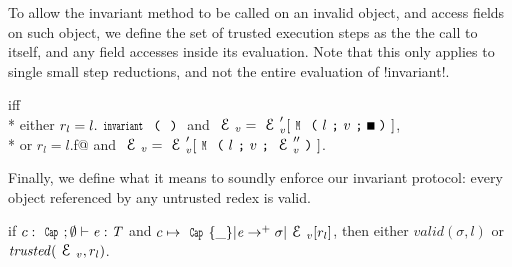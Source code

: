 \noindent 
To allow the invariant method to be called on an invalid object, and access fields on such object, we define the set of trusted execution steps as the the call to \Q@invariant@ itself, and any field accesses inside its evaluation. Note that this only applies to single small step reductions, and not the entire evaluation of \Q!invariant!.

\noindent {} iff\\*
\indent either
$r_l=l.\invariant$ and
$\ctx_v=\ctx_v'[\M{l}{v}{\square}]$,\\*
\indent or
$r_l=l$\Q@.f@ and
$\ctx_v=\ctx_v'[\M{l}{v}{\ctx_v''}]$.

\noindent Finally, we define what it means to soundly enforce our invariant protocol: every object referenced by any untrusted redex is valid.

\begin{theorem}[Soundness]\rm
if $c:\Kw{Cap};\emptyset\vdash \e: \T$ and
$c\mapsto\Kw{Cap}\{\_\}|\e\rightarrow^+ \sigma|\ctx_v[r_l]$, then
either $\mathit{valid}(\sigma,l)$ or $\mathit{trusted}(\ctx_v,r_l)$.
\end{theorem}


